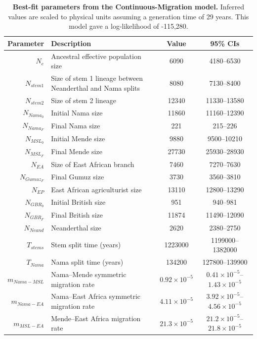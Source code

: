 \documentclass[]{article}
\begin{document}
\begin{table}[ht]
\caption{
    \label{tab:supp-continuous-migration}
    \textbf{Best-fit parameters from the Continuous-Migration model.}
    Inferred values are scaled to physical units assuming a generation time of
    29 years. This model gave a log-likelihood of -115,280.
}
\centering
\begin{tabular}[t]{rP{8cm}cc}
    \toprule
    Parameter & Description & Value & 95\% CIs\\
    \midrule
    $N_e$ & Ancestral effective population size & 6090 & 4180--6530 \\
    $N_{stem1}$ & Size of stem 1 lineage between Neanderthal and Nama splits & 8080 & 7130--8400 \\
    $N_{stem2}$ & Size of stem 2 lineage & 12340 & 11330--13580 \\
    $N_{Nama_0}$ & Initial Nama size & 11860 & 11160--12390 \\
    $N_{Nama_F}$ & Final Nama size & 221 & 215--226 \\
    $N_{MSL_0}$ & Initial Mende size & 9880 & 9500--10210 \\
    $N_{MSL_F}$ & Final Mende size & 27730 & 25930--28930 \\
    $N_{EA}$ & Size of East African branch & 7460 & 7270--7630 \\
    $N_{Gumuz_F}$ & Final Gumuz size & 3730 & 3560--3810 \\
    $N_{EP}$ & East African agriculturist size & 13110 & 12800--13290 \\
    $N_{GBR_0}$ & Initial British size & 951 & 940--981 \\
    $N_{GBR_F}$ & Final British size & 11874 & 11490--12090 \\
    $N_{Neand}$ & Neanderthal size & 2620 & 2380--2750 \\
    $T_{stems}$ & Stem split time (years) & 1223000 & 1199000--1382000 \\
    $T_{Nama}$ & Nama split time (years) & 134200 & 127800--139900 \\
    $m_{Nama-MSL}$ & Nama--Mende symmetric migration rate & $0.92\times10^{-5}$ & $0.41\times10^{-5}$--$1.43\times10^{-5}$ \\
    $m_{Nama-EA}$ & Nama--East Africa symmetric migration rate & $4.11\times10^{-5}$ & $3.92\times10^{-5}$--$4.56\times10^{-5}$ \\
    $m_{MSL-EA}$ & Mende--East Africa migration rate & $21.3\times10^{-5}$ & $21.2\times10^{-5}$--$21.8\times10^{-5}$ \\

\end{tabular}
\end{table}
\end{document}
